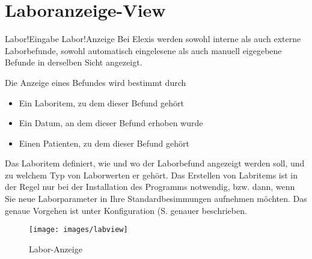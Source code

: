 
\section{Laboranzeige-View}
\index Labor!Eingabe
\index Labor!Anzeige
Bei Elexis werden sowohl interne als auch externe Laborbefunde, sowohl
automatisch eingelesene als auch manuell eigegebene Befunde in derselben Sicht
angezeigt.

Die  Anzeige eines Befundes wird bestimmt durch
\begin{itemize}
  \item Ein Laboritem, zu dem dieser Befund gehört
  \item Ein Datum, an dem dieser Befund erhoben wurde
  \item Einen Patienten, zu dem dieser Befund gehört
\end{itemize}

Das Laboritem definiert, wie und wo der Laborbefund angezeigt werden soll, und
zu welchem Typ von Laborwerten er gehört. Das Erstellen von Labritems ist in der Regel nur bei der Installation des
Programms notwendig, bzw. dann, wenn Sie neue Laborparameter in Ihre
Standardbesimmungen aufnehmen möchten. Das genaue Vorgehen ist unter Konfiguration (S. \pageref{config:labor} genauer beschrieben.

\begin{figure}[htp]
\begin{center}
  \texttt{[image: images/labview]}
  \caption{Labor-Anzeige}
  \label{fig:labview}
\end{center}
\end{figure}

